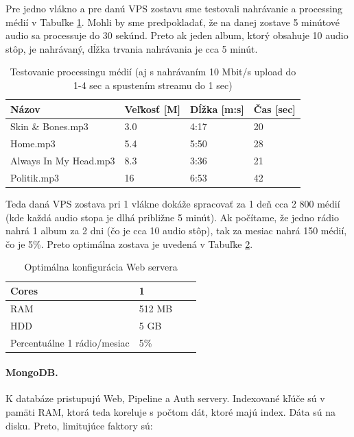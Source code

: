 \documentclass[11pt]{article}
\begin{document}
Pre jedno vlákno a pre danú VPS zostavu sme testovali nahrávanie a processing médií v Tabuľke \ref{testproc}. Mohli by sme predpokladať, že na danej zostave 5 minútové audio sa processuje do 30 sekúnd. Preto ak jeden album, ktorý obsahuje 10 audio stôp, je nahrávaný, dĺžka trvania nahrávania je cca 5 minút.

\begin{table}[htp]
\centering
\begin{tabular}{|l|l|l|l|}
\hline
	Názov                 & Veľkosť [M] & Dĺžka [m:s] & Čas [sec]\\
\hline
	Skin \& Bones.mp3     & 3.0 & 4:17 & 20\\
\hline
	Home.mp3              & 5.4 & 5:50 & 28\\
\hline
	Always In My Head.mp3 & 8.3 & 3:36 & 21\\
\hline
	Politik.mp3           & 16  & 6:53 & 42\\
\hline
\end{tabular}
\caption{Testovanie processingu médií (aj s nahrávaním 10 Mbit/s upload do 1-4 sec a spustením streamu do 1 sec)}
\label{testproc}
\end{table}


Teda daná VPS zostava pri 1 vlákne dokáže spracovať za 1 deň cca 2 800 médií (kde každá audio stopa je dlhá približne 5 minút). Ak počítame, že jedno rádio nahrá 1 album za 2 dni (čo je cca 10 audio stôp), tak za mesiac nahrá 150 médií, čo je 5\%. Preto optimálna zostava je uvedená v Tabuľke \ref{konf3}.



\begin{table}[htp]
\centering
\begin{tabular}{|l|l|l|l|}
\hline
	Cores & 1 \\
\hline
	RAM & 512 MB \\
\hline
	HDD & 5 GB \\
\hline
	Percentuálne 1 rádio/mesiac & 5\% \\
\hline
\end{tabular}
\caption{Optimálna konfigurácia Web servera}
\label{konf3}
\end{table}

\paragraph{MongoDB.} K databáze pristupujú Web, Pipeline a Auth servery. Indexované kľúče sú v pamäti RAM, ktorá teda koreluje s počtom dát, ktoré majú index. Dáta sú na disku. Preto, limitujúce faktory sú:
\end{document}
